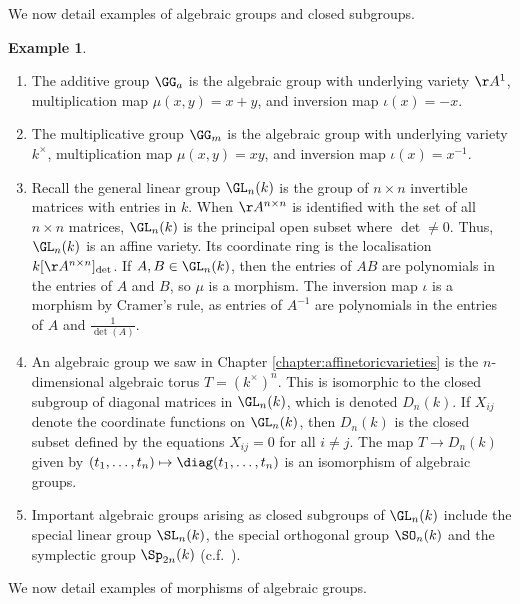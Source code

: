 \documentclass[12pt]{amsart}
\theoremstyle{plain}
\theoremstyle{definition}
\newtheorem{example}[theorem]{Example}
\begin{document}
We now detail examples of algebraic groups and closed subgroups.

\begin{example}
\begin{enumerate}
\item The additive group $\GG_a$ is the algebraic group with underlying variety $\AA^1$, multiplication map $\mu(x, y) = x + y$, and inversion map $\iota(x) = - x$. 
\item The multiplicative group $\GG_m$ is the algebraic group with underlying variety $k^\times$, multiplication map $\mu(x, y) = xy$, and inversion map $\iota(x) = x^{-1}$.
\item Recall the general linear group $\GL_n(k)$ is the group of $n \times n$ invertible matrices with entries in $k$.
When $\AA^{n \times n}$ is identified with the set of all $n \times n$ matrices, $\GL_n(k)$ is the principal open subset where $\det \ne 0$.
Thus, $\GL_n(k)$ is an affine variety.
Its coordinate ring is the localisation $k[\AA^{n \times n}]_{\det}$.
If $A, B \in \GL_n(k)$, then the entries of $AB$ are polynomials in the entries of $A$ and $B$, so $\mu$ is a morphism. 
The inversion map $\iota$ is a morphism by Cramer's rule, as entries of $A^{-1}$ are polynomials in the entries of $A$ and $\frac{1}{\det(A)}$.
\item An algebraic group we saw in Chapter \ref{chapter:affinetoricvarieties} is the $n$-dimensional algebraic torus $T = (k^\times)^n$.
This is isomorphic to the closed subgroup of diagonal matrices in $\GL_n(k)$, which is denoted $D_n(k)$.
If $X_{ij}$ denote the coordinate functions on $\GL_n(k)$, then $D_n(k)$ is the closed subset defined by the equations $X_{ij} = 0$ for all $i \ne j$.
The map $T \to D_n(k)$ given by $(t_1, \ldots, t_n) \mapsto \diag(t_1, \ldots, t_n)$ is an isomorphism of algebraic groups.
\item Important algebraic groups arising as closed subgroups of $\GL_n(k)$ include the special linear group $\SL_n(k)$, the special orthogonal group $\SO_n(k)$ and the symplectic group $\Sp_{2n}(k)$ (c.f.\ \cite[\S 1.3]{Geck13}).
\end{enumerate}
\end{example}

We now detail examples of morphisms of algebraic groups.
\end{document}
